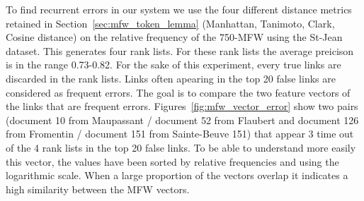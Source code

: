 To find recurrent errors in our system we use the four different distance metrics retained in Section~\ref{sec:mfw_token_lemma} (Manhattan, Tanimoto, Clark, Cosine distance) on the relative frequency of the 750-MFW using the St-Jean dataset.
This generates four rank lists.
For these rank lists the average preicison is in the range 0.73-0.82.
For the sake of this experiment, every true links are discarded in the rank lists.
Links often apearing in the top 20 false links are considered as frequent errors.
The goal is to compare the two feature vectors of the links that are frequent errors.
Figures~\ref{fig:mfw_vector_error} show two pairs (document 10 from Maupassant / document 52 from Flaubert and document 126 from Fromentin / document 151 from Sainte-Beuve 151) that appear 3 time out of the 4 rank lists in the top 20 false links.
To be able to understand more easily this vector, the values have been sorted by relative frequencies and using the logarithmic scale.
When a large proportion of the vectors overlap it indicates a high similarity between the MFW vectors.

